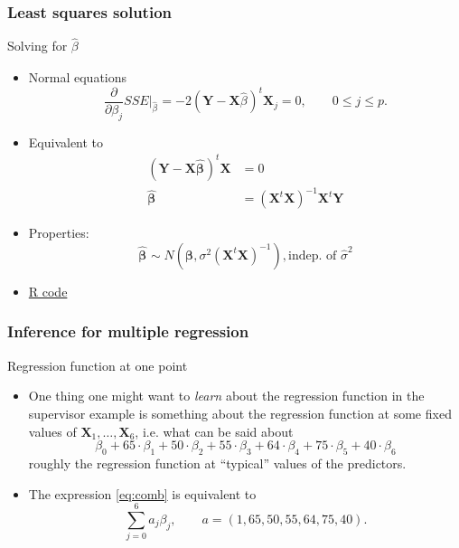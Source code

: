 \documentclass[handout]{beamer}
\newcommand{\Bh}[1]{\widehat{\beta}_{#1}}
\begin{document}

   \begin{frame} \frametitle{Least squares solution}

   \begin{block}
   {Solving for $\Bh{}$}
   \begin{itemize}
   \item Normal equations
   $$
   \frac{\partial}{\partial \beta_j} SSE \biggl|_{\Bh{}} = -2 \left(\pmb{Y} - \pmb{X} \Bh{} \right)^t \pmb{X}_j = 0, \qquad 0 \leq j \leq p.$$

   \item Equivalent to
   $$
   \begin{aligned}
   (\pmb{Y} - \pmb{X}\pmb{\Bh{}})^t\pmb{X} &= 0 \\
   \pmb{\Bh{}} &= (\pmb{X}^t\pmb{X})^{-1}\pmb{X}^t\pmb{Y}
   \end{aligned}
   $$

   \item Properties:
   $$
   \pmb{\Bh{}} \sim N\left(\pmb{\beta}, \sigma^2 (\pmb{X}^t \pmb{X})^{-1} \right), \text{indep. of $\widehat{\sigma}^2$}
   $$
   \item  \href{http://stats191.stanford.edu/multiple.html}{R code}
   \end{itemize}
   \end{block}
   \end{frame}


   \begin{frame} \frametitle{Inference for multiple regression}

   \begin{block}
   {Regression function at one point}

   \begin{itemize}
   \item One thing one might want to {\em learn} about the regression function in the supervisor example is something about the regression function at some fixed values of $\pmb{X}_{1}, \dots, \pmb{X}_{6}$, i.e. what can be said about
   \begin{equation}
   \label{eq:comb}
   \beta_0 + 65 \cdot \beta_1  + 50 \cdot \beta_2  + 55 \cdot \beta_3 + 64 \cdot \beta_4 + 75 \cdot \beta_5 + 40 \cdot \beta_6   \tag{*}
   \end{equation}
   roughly the regression function at ``typical'' values of the predictors.

   \item The expression \eqref{eq:comb} is equivalent to
   $$
   \sum_{j=0}^6 a_j \beta_j, \qquad a=(1,65,50,55,64,75,40).$$
   \end{itemize}
   \end{block}
   \end{frame}
\end{document}
